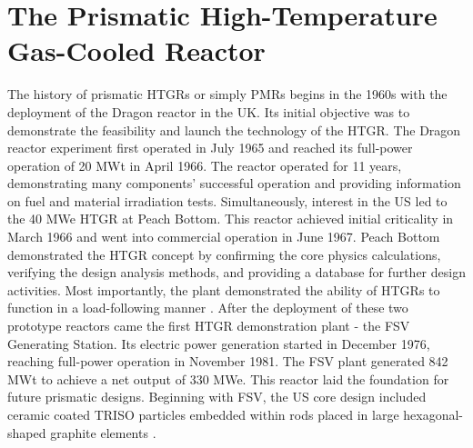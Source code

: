 \section{The Prismatic High-Temperature Gas-Cooled Reactor}
\label{sec:pmr}

The history of prismatic \glspl{HTGR} or simply \glspl{PMR} begins in the 1960s with the deployment of the Dragon reactor in the \gls{UK}.
Its initial objective was to demonstrate the feasibility and launch the technology of the \gls{HTGR}.
The Dragon reactor experiment first operated in July 1965 and reached its full-power operation of 20 MWt in April 1966.
The reactor operated for 11 years, demonstrating many components' successful operation and providing information on fuel and material irradiation tests.
Simultaneously, interest in the \gls{US} led to the 40 MWe \gls{HTGR} at Peach Bottom.
This reactor achieved initial criticality in March 1966 and went into commercial operation in June 1967.
Peach Bottom demonstrated the \gls{HTGR} concept by confirming the core physics calculations, verifying the design analysis methods, and providing a database for further design activities.
Most importantly, the plant demonstrated the ability of \glspl{HTGR} to function in a load-following manner \cite{brey_development_2001}.
After the deployment of these two prototype reactors came the first \gls{HTGR} demonstration plant - the \gls{FSV} Generating Station.
Its electric power generation started in December 1976, reaching full-power operation in November 1981.
The \gls{FSV} plant generated 842 MWt to achieve a net output of 330 MWe.
This reactor laid the foundation for future prismatic designs.
Beginning with \gls{FSV}, the \gls{US} core design included ceramic coated \gls{TRISO} particles embedded within rods placed in large hexagonal-shaped graphite elements \cite{brey_development_2001}.

